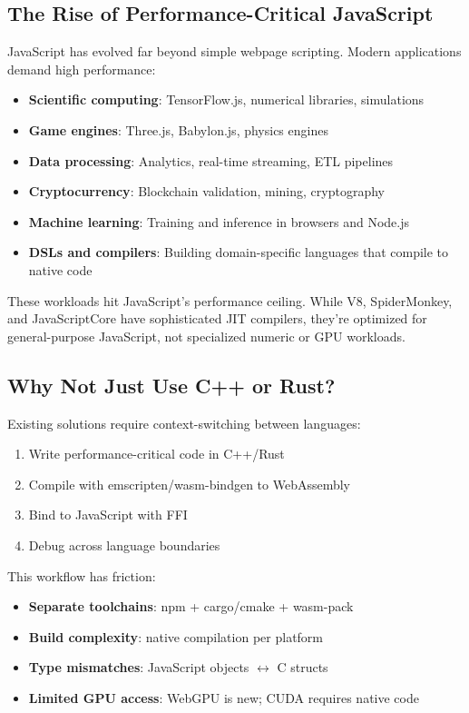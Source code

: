 \documentclass[11pt]{article}
\begin{document}
\subsection{The Rise of Performance-Critical JavaScript}
JavaScript has evolved far beyond simple webpage scripting. Modern applications demand high performance:

\begin{itemize}[noitemsep]
  \item \textbf{Scientific computing}: TensorFlow.js, numerical libraries, simulations
  \item \textbf{Game engines}: Three.js, Babylon.js, physics engines
  \item \textbf{Data processing}: Analytics, real-time streaming, ETL pipelines
  \item \textbf{Cryptocurrency}: Blockchain validation, mining, cryptography
  \item \textbf{Machine learning}: Training and inference in browsers and Node.js
  \item \textbf{DSLs and compilers}: Building domain-specific languages that compile to native code
\end{itemize}

These workloads hit JavaScript's performance ceiling. While V8, SpiderMonkey, and JavaScriptCore have sophisticated JIT compilers, they're optimized for general-purpose JavaScript, not specialized numeric or GPU workloads.

\subsection{Why Not Just Use C++ or Rust?}
Existing solutions require context-switching between languages:

\begin{enumerate}[noitemsep]
  \item Write performance-critical code in C++/Rust
  \item Compile with emscripten/wasm-bindgen to WebAssembly
  \item Bind to JavaScript with FFI
  \item Debug across language boundaries
\end{enumerate}

This workflow has friction:
\begin{itemize}[noitemsep]
  \item \textbf{Separate toolchains}: npm + cargo/cmake + wasm-pack
  \item \textbf{Build complexity}: native compilation per platform
  \item \textbf{Type mismatches}: JavaScript objects $\leftrightarrow$ C structs
  \item \textbf{Limited GPU access}: WebGPU is new; CUDA requires native code
\end{itemize}
\end{document}
